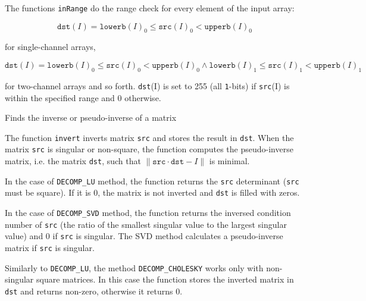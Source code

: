 The functions \texttt{inRange} do the range check for every element of the input array:

\[
\texttt{dst}(I)=\texttt{lowerb}(I)_0 \leq \texttt{src}(I)_0 < \texttt{upperb}(I)_0
\]

for single-channel arrays,

\[
\texttt{dst}(I)=
\texttt{lowerb}(I)_0 \leq \texttt{src}(I)_0 < \texttt{upperb}(I)_0 \land
\texttt{lowerb}(I)_1 \leq \texttt{src}(I)_1 < \texttt{upperb}(I)_1
\]

for two-channel arrays and so forth.
\texttt{dst}(I) is set to 255 (all \texttt{1}-bits) if \texttt{src}(I) is within the specified range and 0 otherwise.


Finds the inverse or pseudo-inverse of a matrix

\begin{description}
\end{description}

The function \texttt{invert} inverts matrix \texttt{src} and stores the result in \texttt{dst}.
When the matrix \texttt{src} is singular or non-square, the function computes the pseudo-inverse matrix, i.e. the matrix \texttt{dst}, such that $\|\texttt{src} \cdot \texttt{dst} - I\|$ is minimal.

In the case of \texttt{DECOMP\_LU} method, the function returns the \texttt{src} determinant (\texttt{src} must be square). If it is 0, the matrix is not inverted and \texttt{dst} is filled with zeros.

In the case of \texttt{DECOMP\_SVD} method, the function returns the inversed condition number of \texttt{src} (the ratio of the smallest singular value to the largest singular value) and 0 if \texttt{src} is singular. The SVD method calculates a pseudo-inverse matrix if \texttt{src} is singular.

Similarly to \texttt{DECOMP\_LU}, the method \texttt{DECOMP\_CHOLESKY} works only with non-singular square matrices. In this case the function stores the inverted matrix in \texttt{dst} and returns non-zero, otherwise it returns 0.

